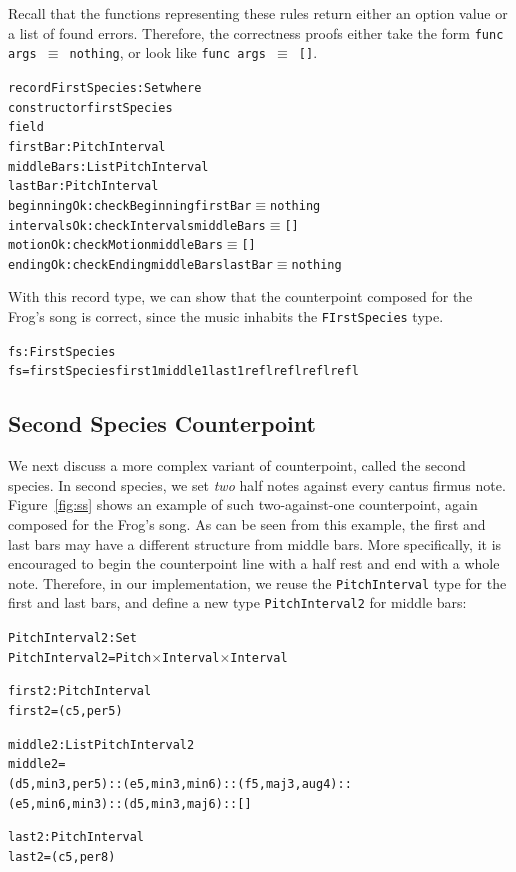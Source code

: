 \noindent Recall that the functions representing these rules return
either an option value or a list of found errors.
Therefore, the correctness proofs either take the form
\texttt{func args $\equiv$ nothing}, or look like
\texttt{func args $\equiv$ []}.

\begin{alltt}
record FirstSpecies : Set where
  constructor firstSpecies
  field
    firstBar    : PitchInterval
    middleBars  : List PitchInterval
    lastBar     : PitchInterval
    beginningOk : checkBeginning firstBar \(\equiv\) nothing
    intervalsOk : checkIntervals middleBars \(\equiv\) []
    motionOk    : checkMotion middleBars \(\equiv\) []
    endingOk    : checkEnding middleBars lastBar \(\equiv\) nothing
\end{alltt}

With this record type, we can show that the counterpoint composed
for the Frog's song is correct, since the music inhabits the
\texttt{FIrstSpecies} type.

\begin{alltt}
fs : FirstSpecies
fs = firstSpecies first1 middle1 last1 refl refl refl refl
\end{alltt}

\subsection{Second Species Counterpoint}
\label{sec:cp:ss}

\SS

We next discuss a more complex variant of counterpoint, called the
second species.
In second species, we set \emph{two} half notes against every cantus
firmus note.
Figure~\ref{fig:ss} shows an example of such two-against-one
counterpoint, again composed for the Frog's song.
As can be seen from this example, the first and last bars may have
a different structure from middle bars.
More specifically, it is encouraged to begin the counterpoint line with
a half rest and end with a whole note.
Therefore, in our implementation, we reuse the \texttt{PitchInterval} 
type for the first and last bars, and define a new type
\texttt{PitchInterval2} for middle bars:

\begin{alltt}
PitchInterval2 : Set
PitchInterval2 = Pitch \(\times\) Interval \(\times\) Interval

first2 : PitchInterval
first2 = (c 5 , per5)

middle2 : List PitchInterval2
middle2 =
  (d 5 , min3 , per5) :: (e 5 , min3 , min6) :: (f 5 , maj3 , aug4) ::
  (e 5 , min6 , min3) :: (d 5 , min3 , maj6) :: []

last2 : PitchInterval
last2 = (c 5 , per8)
\end{alltt}

